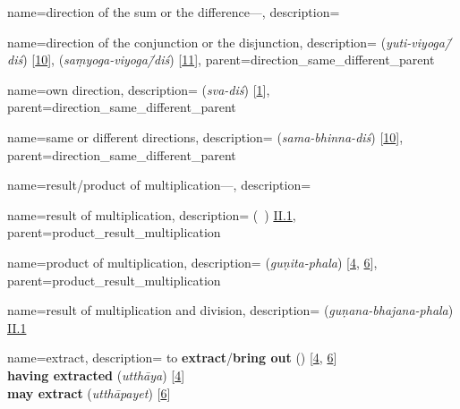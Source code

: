 {
        name={direction of the sum or the difference---},
        description={\phantom{x}\nopagebreak}
}

{
        name={direction of the conjunction or the disjunction},
        description={ (\textit{yuti-viyoga\=/diś}) [\hyperlink{SEpass10}{10}],  (\textit{saṃyoga-viyoga\=/diś}) [\hyperlink{SEpass11}{11}]},
        parent={direction_same_different_parent}
}

{
        name={own direction},
        description={ (\textit{sva-diś}) [\hyperlink{SEpass1}{1}]},
        parent={direction_same_different_parent}
}

{
        name={same or different directions},
        description={ (\textit{sama-bhinna-diś}) [\hyperlink{SEpass10}{10}]},
        parent={direction_same_different_parent}
}

{
        name={result/product of multiplication---},
        description={\phantom{x}\nopagebreak}
}

{
        name={result of multiplication},
        description={ (\hasil\idafaconsonant\ \darb) \hyperlink{Pii1}{II.1}},
        parent={product_result_multiplication}
} 

{
        name={product of multiplication},
        description={ (\textit{guṇita-phala}) [\hyperlink{SEpass4}{4}, \hyperlink{SEpass6}{6}]},
        parent={product_result_multiplication}
}
       

{
        name={result of multiplication and division},
        description={  (\textit{guṇana-bhajana-phala}) \hyperlink{Sii1}{II.1}}
}

{
        name={extract},
        description={\newline 
        to \textbf{extract}/\textbf{bring out}\quad {} (\darardan) [\hyperlink{PEpass4}{4}, \hyperlink{PEpass6}{6}]\\[.2\baselineskip]
        \textbf{having extracted}\quad {} (\textit{utthāya}) [\hyperlink{SEpass4}{4}]\\[0.2\baselineskip]
        \textbf{may extract}\quad {} (\textit{utthāpayet}) [\hyperlink{SEpass6}{6}]}
}


